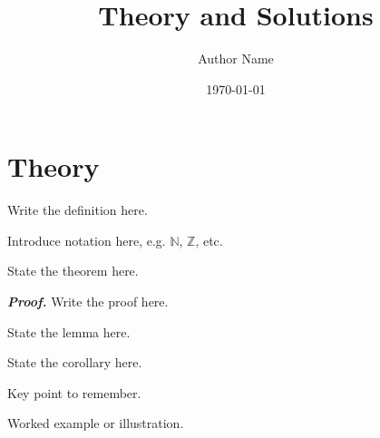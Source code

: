 \documentclass[a4paper, 12pt]{article}
\title{Theory and Solutions}
\author{Author Name}
\date{\today}
\begin{document}
\maketitle
\tableofcontents
\newpage

\section{Theory}

\begin{definition}[Name]
  Write the definition here.
\end{definition}

\begin{designation}
  Introduce notation here, e.g. $\mathbb{N}$, $\mathbb{Z}$, etc.
\end{designation}

\begin{theorem}[Name]
  State the theorem here.
\end{theorem}

\begin{thmproof}
  \textbf{\textit{Proof.}} Write the proof here.
\end{thmproof}

\begin{lemma}[Name]
  State the lemma here.
\end{lemma}

\begin{corollary}[Name]
  State the corollary here.
\end{corollary}

\begin{nota bene}[Title]
  Key point to remember.
\end{nota bene}

\begin{example}
  Worked example or illustration.
\end{example}
\end{document}
